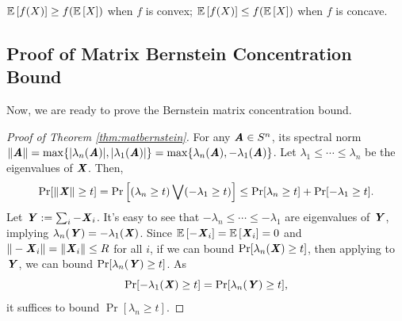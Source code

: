 \begin{lemma}
  \label{lem:Jensen}
  $\E{f(X)} \geq f(\E{X})$ when $f$ is convex;
  $\E{f(X)} \leq f(\E{X})$ when $f$ is concave.
\end{lemma}

\subsection{Proof of Matrix Bernstein Concentration Bound}
Now, we are ready to prove the Bernstein matrix concentration bound.
\begin{proof}[Proof of Theorem \ref{thm:matbernstein}]
  For any $\AA\in S^n$, its spectral norm $\|\AA\| = \max\{|\lambda_n(\AA)|,|\lambda_1(\AA)|\} = \max\{\lambda_n(\AA),-\lambda_1(\AA)\}$.
  Let $\lambda_1\leq\cdots\leq\lambda_n$ be the eigenvalues of $\XX$. Then,
  \[\Pr[\|\XX\|\geq t] = \Pr\left[(\lambda_n \geq t) \bigvee (-\lambda_1 \geq t)\right] \leq \Pr[\lambda_n \geq t]+\Pr[-\lambda_1 \geq t]. \]
  Let $\YY:=\sum_i -\XX_i$. It's easy to see that $-\lambda_n\leq\cdots\leq-\lambda_1$ are eigenvalues of $\YY$, implying $\lambda_n(\YY)=-\lambda_1(\XX)$.
  Since $\E{-\XX_i} = \E{\XX_i} = 0$ and $\|-\XX_i\|=\|\XX_i\|\leq R$ for all $i$, if we can bound $\Pr[\lambda_n(\XX)\geq t]$, then applying to $\YY$, we can bound $\Pr[\lambda_n(\YY)\geq t]$.
  As
  \[ \Pr[-\lambda_1(\XX)\geq t] = \Pr[\lambda_n(\YY)\geq t], \]
  it suffices to bound $\Pr[\lambda_n \geq t]$.


\end{proof}
